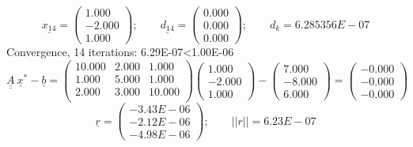 \documentclass{report}[10pts]
\begin{document}
\[
      \underline{x_{14}}=
      \begin{pmatrix}
      1.000 \\ -2.000 \\ 1.000
      \end{pmatrix}
   ;\qquad
      \underline{d_{14}}=
      \begin{pmatrix}
      0.000 \\ 0.000 \\ 0.000
      \end{pmatrix}
   ;\qquad
   d_k=6.285356E-07
\]
Convergence, 14 iterations: 6.29E-07<1.00E-06
\[
   \underline{\underline{A}}~\underline{x}^*-\underline{b}=
      \begin{pmatrix}
         10.000 & 2.000 & 1.000\\
         1.000 & 5.000 & 1.000\\
         2.000 & 3.000 & 10.000\\
      \end{pmatrix}
      \begin{pmatrix}
      1.000 \\ -2.000 \\ 1.000
      \end{pmatrix}
   -
      \begin{pmatrix}
      7.000 \\ -8.000 \\ 6.000
      \end{pmatrix}
   =
      \begin{pmatrix}
      -0.000 \\ -0.000 \\ -0.000
      \end{pmatrix}
\]
\[
      \underline{r}=
      \begin{pmatrix}
      -3.43E-06 \\ -2.12E-06 \\ -4.98E-06
      \end{pmatrix}
   ;\qquad
   ||r||=6.23E-07
\]
\end{document}
